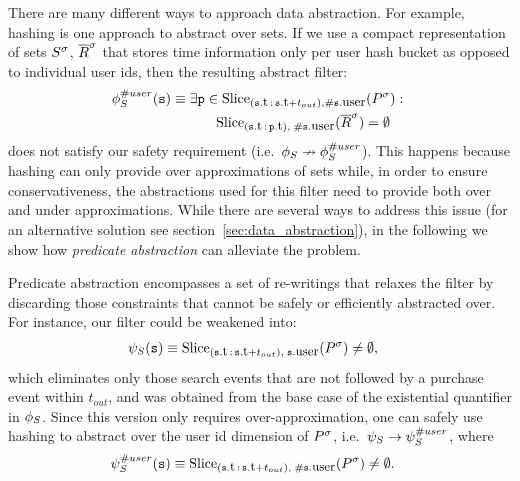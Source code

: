 There are many different ways to approach data abstraction.  For example, 
hashing
is one approach to abstract over sets.  If we use a compact representation of
sets ${S}^{\sigma}$, ${\overline{R}}^{\sigma}$ that stores time information only per user hash
bucket as opposed to individual user ids, then the resulting abstract filter:
\begin{align*}
&
\PrecedesP^{\hashid{user}}(\symv{s}) \equiv 
\exists \symv{p} \in 
\slice{\syms{P}}
{(\facc{\symv{s}}{t}\,:\,\facc{\symv{s}}{t} + t_{out}),
	\hashid{\facc{\symv{s}}{user}}} :\ 
\\
&\qqquad\qquad\quad\;\,
\slice{\syms{\oR}}
{(\facc{\symv{s}}{t}\,:\,\facc{\symv{p}}{t}),\; 
	\hashid{\facc{\symv{s}}{user}}}
= \emptyset 
\end{align*}
does not satisfy our safety requirement 
(i.e.\ $\phi_{S} \nrightarrow \phi_{S}^{\# user}$).
This happens because hashing can only provide over approximations of sets while,
in order to ensure conservativeness, the abstractions used for this filter need
to provide both over and under approximations.
While there are several ways to address this issue (for an alternative solution 
see section~\ref{sec:data_abstraction}), 
in the following we show how {\em predicate abstraction} can alleviate the 
problem.


Predicate abstraction encompasses a set of re-writings 
that relaxes the filter by discarding those constraints that cannot be safely
or efficiently abstracted over.
For instance, our filter could be weakened into:
\begin{align*}
&
\PrecedesPPP(\symv{s}) \equiv 
\slice{\syms{P}}
{(\facc{\symv{s}}{t}\,:\,\facc{\symv{s}}{t} + t_{out}),\; 
	\facc{\symv{s}}{user}}
\neq \emptyset,
\end{align*} 
which eliminates only those search events that are not followed by a purchase
event within $t_{out}$, and was obtained from the base case of
the existential quantifier in $\phi_{S}$.
Since this version only requires over-approximation, one can safely use hashing
to abstract over the user id dimension of ${P}^{\sigma}$, i.e.\ 
$\psi_S \rightarrow \psi_S^{\# user}$, where
\begin{align*}
&
\PrecedesPPP^{\hashid{user}}(\symv{s}) \equiv 
\slice{\syms{P}}
{(\facc{\symv{s}}{t}\,:\,\facc{\symv{s}}{t} + t_{out}),\; 
	\hashid{\facc{\symv{s}}{user}}}
\neq \emptyset .
\end{align*}


